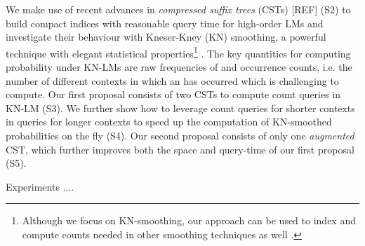 %
%
%
%
 
We make use of recent advances in 
\emph{compressed suffix trees} (CSTs) [REF] (S2) to build compact indices  
with reasonable query time for high-order \ngram LMs and investigate their behaviour 
with Kneser-Kney (KN) smoothing,  
a powerful technique with elegant statistical properties\footnote{Although
we focus on KN-smoothing, our approach can be used to index and compute
counts needed in other smoothing techniques as well \cite{chen1996empirical}.}  
\cite{kneser1995improved}.
% 
The key quantities for computing probability under KN-LMs
are raw frequencies of \ngrams 
and occurrence counts, i.e. the number of different contexts 
in which an \ngram has 
occurred which is challenging to compute.
%
%
Our first proposal consists of two CSTs to compute count queries 
in KN-LM (S3). 
% 
We further show how to leverage count queries for shorter contexts in queries for 
longer contexts to speed up the computation of KN-smoothed probabilities on the fly (S4).
%
Our second proposal consists of only one \emph{augmented} CST, which 
further improves both the space and query-time of our first proposal (S5). 
% 

Experiments ....


